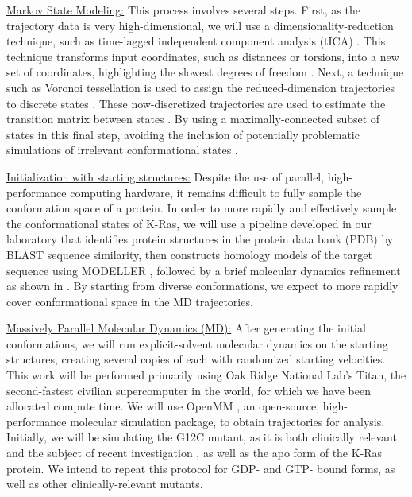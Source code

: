 \documentclass[12pt]{article}
\begin{document}
 \underline{Markov State Modeling:} This process involves several steps. First, as the trajectory data is very high-dimensional, we will use a dimensionality-reduction technique, such as time-lagged independent component analysis (tICA) \cite{perez2013}. This technique transforms input coordinates, such as distances or torsions, into a new set of coordinates, highlighting the slowest degrees of freedom \cite{chodera2014}. Next, a technique such as Voronoi tessellation is used to assign the reduced-dimension trajectories to discrete states \cite{chodera2014}. These now-discretized trajectories are used to estimate the transition matrix between states \cite{chodera2014}. By using a maximally-connected subset of states in this final step, avoiding the inclusion of potentially problematic simulations of irrelevant conformational states \cite{kyle}. 
 
    \underline{Initialization with starting structures:} Despite the use of parallel, high-performance computing hardware, it remains difficult to fully sample the conformation space of a protein. In order to more rapidly and effectively sample the conformational states of K-Ras, we will use a pipeline developed in our laboratory that identifies protein structures in the protein data bank (PDB) by BLAST \cite{blast} sequence similarity, then constructs homology models of the target sequence using MODELLER \cite{modeller}, followed by a brief molecular dynamics refinement as shown in . By starting from diverse conformations, we expect to more rapidly cover conformational space in the MD trajectories.
      
   \underline{Massively Parallel Molecular Dynamics (MD):} After generating the initial conformations, we will run explicit-solvent molecular dynamics on the starting structures, creating several copies of each with randomized starting velocities. This work will be performed primarily using Oak Ridge National Lab's Titan, the second-fastest civilian supercomputer in the world, for which we have been allocated compute time. We will use OpenMM \cite{openmm}, an open-source, high-performance molecular simulation package, to obtain trajectories for analysis. Initially, we will be simulating the G12C mutant, as it is both clinically relevant and the subject of recent investigation \cite{ostrem2013}, as well as the apo form of the K-Ras protein. We intend to repeat this protocol for GDP- and GTP- bound forms, as well as other clinically-relevant mutants.
  
\end{document}
